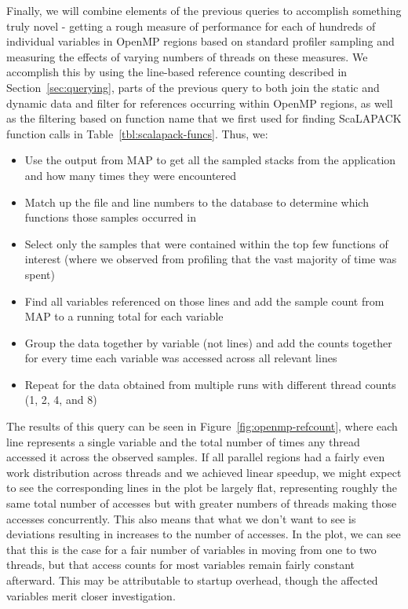 Finally, we will combine elements of the previous queries to accomplish something truly novel - 
getting a rough measure of performance for each of hundreds of individual variables in OpenMP 
regions based on standard profiler sampling and measuring the effects of varying numbers of 
threads on these measures.
We accomplish this by using the line-based reference counting described in 
Section~\ref{sec:querying}, parts of the previous query to both join the static and dynamic data and 
filter for references occurring within OpenMP regions, as well as the filtering based on function name 
that we first used for finding ScaLAPACK function calls in Table~\ref{tbl:scalapack-funcs}.
Thus, we:
\begin{itemize}
\item Use the output from MAP to get all the sampled stacks from the application and how many 
times they were encountered
\item Match up the file and line numbers to the database to determine which functions those samples 
occurred in
\item Select only the samples that were contained within the top few functions of interest (where we 
observed from profiling that the vast majority of time was spent)
\item Find all variables referenced on those lines and add the sample count from MAP to a running 
total for each variable
\item Group the data together by variable (not lines) and add the counts together for every time each 
variable was accessed across all relevant lines
\item Repeat for the data obtained from multiple runs with different thread counts (1, 2, 4, and 8)
\end{itemize}
The results of this query can be seen in Figure~\ref{fig:openmp-refcount}, where each line 
represents a single variable and the total number of times any thread accessed it across the 
observed samples.
If all parallel regions had a fairly even work distribution across threads and we achieved linear 
speedup, we might expect to see the corresponding lines in the plot be largely flat, representing 
roughly the same total number of accesses but with greater numbers of threads making those 
accesses concurrently.
This also means that what we don't want to see is deviations resulting in increases to the number of 
accesses.
In the plot, we can see that this is the case for a fair number of variables in moving from one to two 
threads, but that access counts for most variables remain fairly constant afterward.
This may be attributable to startup overhead, though the affected variables merit closer investigation.

